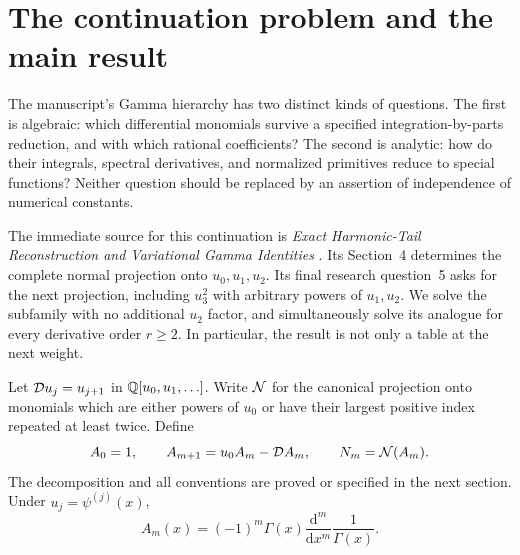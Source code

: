 \section{The continuation problem and the main result}
\label{ag:sec:problem}

The manuscript's Gamma hierarchy has two distinct kinds of questions.
The first is algebraic: which differential monomials survive a specified
integration-by-parts reduction, and with which rational coefficients?
The second is analytic: how do their integrals, spectral derivatives,
and normalized primitives reduce to special functions? Neither question
should be replaced by an assertion of independence of numerical constants.

The immediate source for this continuation is \emph{Exact Harmonic-Tail
Reconstruction and Variational Gamma Identities} \cite{HTG}. Its
Section~4 determines the complete normal projection onto $u_0,u_1,u_2$.
Its final research question~5 asks for the next projection, including
$u_3^2$ with arbitrary powers of $u_1,u_2$. We solve the subfamily with
no additional $u_2$ factor, and simultaneously solve its analogue for
every derivative order $r\ge2$. In particular, the result is not only
a table at the next weight.

Let $\mathcal D u_j=u_{j+1}$ in $\mathbb Q[u_0,u_1,\ldots]$. Write $\mathcal N$ for the
canonical projection onto monomials which are either powers of $u_0$
or have their largest positive index repeated at least twice. Define
\begin{equation}\label{ag:eq:hierarchy-intro}
 A_0=1,\qquad A_{m+1}=u_0A_m-\mathcal D A_m,\qquad N_m=\mathcal N(A_m).
\end{equation}
The decomposition and all conventions are proved or specified in the
next section. Under $u_j=\psi^{(j)}(x)$,
\[
 A_m(x)=(-1)^m\Gamma(x)\frac{\mathrm d^m}{\mathrm dx^m}\frac1{\Gamma(x)}.
\]

